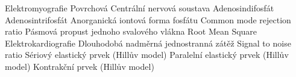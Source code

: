  {Elektromyografie}
 {Povrchová }
 {Centrální nervová soustava}
 {Adenosindifosfát}
 {Adenosintrifosfát}
 {Anorganická iontová forma fosfátu}
 {Common mode rejection ratio}
 {Pásmová propust}
 { jednoho svalového vlákna}
 {Root Mean Square}
 {Elektrokardiografie}
 {Dlouhodobá nadměrná jednostranná zátěž}
 {Signal to noise ratio}
 {Sériový elastický prvek (Hillův model)}
 {Paralelní elastický prvek (Hillův model)}
 {Kontrakční prvek (Hillův model)}

